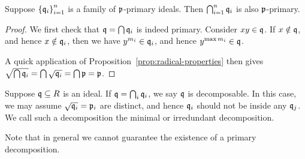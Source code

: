 \begin{lemma}
    Suppose \({\{\mathfrak{q}_i\}}_{i=1}^n\) is a family of \(\mathfrak{p}\)-primary ideals.
    Then \(\bigcap_{i=1}^n \mathfrak{q}_i\) is also \(\mathfrak{p}\)-primary.
\end{lemma}
\begin{proof}
    We first check that \(\mathfrak{q} = \bigcap \mathfrak{q}_i\) is indeed primary.
    Consider \(xy \in \mathfrak{q}\).
    If \(x \notin \mathfrak{q}\), and hence \(x \notin \mathfrak{q}_i\),
    then we have \(y^{m_i} \in \mathfrak{q}_i\),
    and hence \(y^{\max m_i} \in \mathfrak{q}\).

    A quick application of Proposition~\ref{prop:radical-properties} then gives
    \(\sqrt{\bigcap \mathfrak{q}_i} = \bigcap \sqrt{\mathfrak{q}_i} = \bigcap \mathfrak{p} = \mathfrak{p}\).
\end{proof}
\begin{definition}
    Suppose \(\mathfrak{q} \subseteq R\) is an ideal.
    If \(\mathfrak{q} = \bigcap_i \mathfrak{q}_i\), we say \(\mathfrak{q}\) is decomposable.
    In this case, we may assume \(\sqrt{\mathfrak{q}_i} = \mathfrak{p}_i\) are distinct,
    and hence \(\mathfrak{q}_i\) should not be inside any \(\mathfrak{q}_j\).
    We call such a decomposition the minimal or irredundant decomposition.
\end{definition}
\begin{remark}
    Note that in general we cannot guarantee the existence of a primary decomposition.
\end{remark}

